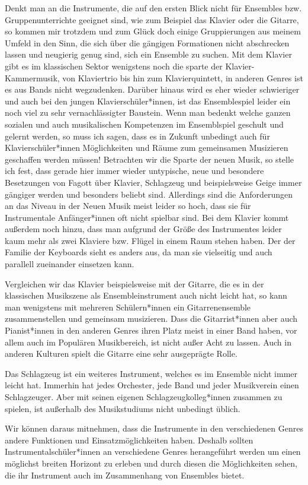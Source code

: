 Denkt man an die Instrumente, die auf den ersten Blick nicht für Ensembles bzw.
Gruppenunterrichte geeignet sind, wie zum Beispiel das Klavier oder die Gitarre,
so kommen mir trotzdem und zum Glück doch einige Gruppierungen aus meinem Umfeld
in den Sinn, die sich über die gängigen Formationen nicht abschrecken lassen und
neugierig genug sind, sich ein Ensemble zu suchen. Mit dem Klavier gibt es im
klassischen Sektor wenigstens noch die sparte der Klavier-Kammermusik, von
Klaviertrio bis hin zum Klavierquintett, in anderen Genres ist es aus Bands
nicht wegzudenken. Darüber hinaus wird es eher wieder schwieriger und auch bei
den jungen Klavierschüler*innen, ist das Ensemblespiel leider ein noch viel zu
sehr vernachlässigter Baustein. Wenn man bedenkt welche ganzen sozialen und auch
musikalischen Kompetenzen im Ensemblspiel geschult und gelernt werden, so muss
ich sagen, dass es in Zukunft unbedingt auch für Klavierschüler*innen
Möglichkeiten und Räume zum gemeinsamen Musizieren geschaffen werden müssen!
Betrachten wir die Sparte der neuen Musik, so stelle ich fest, dass gerade hier
immer wieder untypische, neue und besondere Besetzungen von Fagott über Klavier,
Schlagzeug und beispielsweise Geige immer gängiger werden und besonders beliebt
sind. Allerdings sind die Anforderungen an das Niveau in der Neuen Musik meist
leider so hoch, dass sie für Instrumentale Anfänger*innen oft nicht spielbar
sind. Bei dem Klavier kommt außerdem noch hinzu, dass man aufgrund der Größe des
Instrumentes leider kaum mehr als zwei Klaviere bzw. Flügel in einem Raum stehen
haben. Der der Familie der Keyboards sieht es anders aus, da man sie vielseitig
und auch parallell zueinander einsetzen kann.

Vergleichen wir das Klavier beispielsweise mit der Gitarre, die es in der
klassischen Musikszene als Ensembleinstrument auch nicht leicht hat, so kann man
wenigstens mit mehreren Schülern*innen ein Gitarrenensemble zusammenstellen und
gemeinsam musizieren. Dass die Gitarrist*innen aber auch Pianist*innen in den
anderen Genres ihren Platz meist in einer Band haben, vor allem auch im
Populären Musikbereich, ist nicht außer Acht zu lassen. Auch in anderen Kulturen
spielt die Gitarre eine sehr ausgeprägte Rolle.

Das Schlagzeug ist ein weiteres Instrument, welches es im Ensemble nicht immer
leicht hat. Immerhin hat jedes Orchester, jede Band und jeder Musikverein einen
Schlagzeuger. Aber mit seinen eigenen Schlagzeugkolleg*innen zusammen zu
spielen, ist außerhalb des Musikstudiums nicht unbedingt üblich. 

Wir können daraus mitnehmen, dass die Instrumente in den verschiedenen Genres
andere Funktionen und Einsatzmöglichkeiten haben. Deshalb sollten
Instrumentalschüler*innen an verschiedene Genres herangeführt werden um einen
möglichst breiten Horizont zu erleben und durch diesen die Möglichkeiten sehen,
die ihr Instrument auch im Zusammenhang von Ensembles bietet. 





